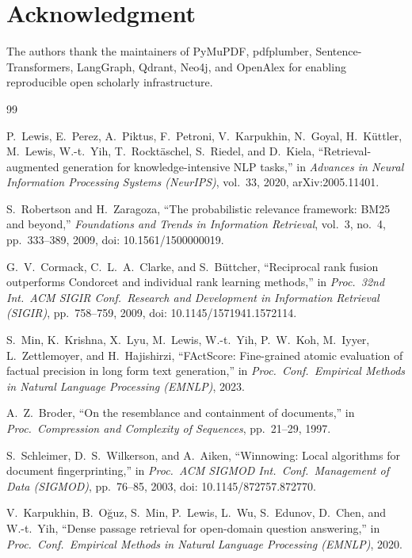 \documentclass[conference]{IEEEtran}
\begin{document}
\section*{Acknowledgment}
The authors thank the maintainers of PyMuPDF, pdfplumber, Sentence-Transformers, LangGraph, Qdrant, Neo4j, and OpenAlex for enabling reproducible open scholarly infrastructure.

\begin{thebibliography}{99}

P.~Lewis, E.~Perez, A.~Piktus, F.~Petroni, V.~Karpukhin, N.~Goyal, H.~K\"{u}ttler, M.~Lewis, W.-t.~Yih, T.~Rockt\"{a}schel, S.~Riedel, and D.~Kiela, ``Retrieval-augmented generation for knowledge-intensive NLP tasks,'' in \emph{Advances in Neural Information Processing Systems (NeurIPS)}, vol.~33, 2020, arXiv:2005.11401.

S.~Robertson and H.~Zaragoza, ``The probabilistic relevance framework: BM25 and beyond,'' \emph{Foundations and Trends in Information Retrieval}, vol.~3, no.~4, pp.~333--389, 2009, doi: 10.1561/1500000019.

G.~V.~Cormack, C.~L.~A.~Clarke, and S.~B\"{u}ttcher, ``Reciprocal rank fusion outperforms Condorcet and individual rank learning methods,'' in \emph{Proc.\ 32nd Int.\ ACM SIGIR Conf.\ Research and Development in Information Retrieval (SIGIR)}, pp.~758--759, 2009, doi: 10.1145/1571941.1572114.

S.~Min, K.~Krishna, X.~Lyu, M.~Lewis, W.-t.~Yih, P.~W.~Koh, M.~Iyyer, L.~Zettlemoyer, and H.~Hajishirzi, ``FActScore: Fine-grained atomic evaluation of factual precision in long form text generation,'' in \emph{Proc.\ Conf.\ Empirical Methods in Natural Language Processing (EMNLP)}, 2023.

A.~Z.~Broder, ``On the resemblance and containment of documents,'' in \emph{Proc.\ Compression and Complexity of Sequences}, pp.~21--29, 1997.

S.~Schleimer, D.~S.~Wilkerson, and A.~Aiken, ``Winnowing: Local algorithms for document fingerprinting,'' in \emph{Proc.\ ACM SIGMOD Int.\ Conf.\ Management of Data (SIGMOD)}, pp.~76--85, 2003, doi: 10.1145/872757.872770.

V.~Karpukhin, B.~O\u{g}uz, S.~Min, P.~Lewis, L.~Wu, S.~Edunov, D.~Chen, and W.-t.~Yih, ``Dense passage retrieval for open-domain question answering,'' in \emph{Proc.\ Conf.\ Empirical Methods in Natural Language Processing (EMNLP)}, 2020.


\end{thebibliography}
\end{document}
